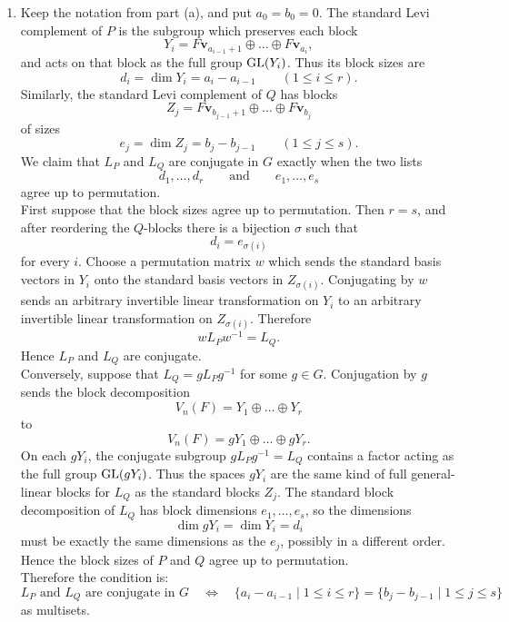\documentclass[../Odyssey_Project.tex]{subfiles}
\begin{document}
\begin{solution}
\begin{enumerate}
        \item[(b)] Keep the notation from part (a), and put $a_0=b_0=0$. The standard Levi complement of $P$ is the subgroup which preserves each block
    \[
        Y_i=F\mathbf{v}_{a_{i-1}+1}\oplus \dots \oplus F\mathbf{v}_{a_i},
    \]
    and acts on that block as the full group $\operatorname{GL}(Y_i)$. Thus its block sizes are
    \[
        d_i=\dim Y_i=a_i-a_{i-1}
        \qquad (1\leq i\leq r).
    \]
    Similarly, the standard Levi complement of $Q$ has blocks
    \[
        Z_j=F\mathbf{v}_{b_{j-1}+1}\oplus \dots \oplus F\mathbf{v}_{b_j}
    \]
    of sizes
    \[
        e_j=\dim Z_j=b_j-b_{j-1}
        \qquad (1\leq j\leq s).
    \]
    We claim that $L_P$ and $L_Q$ are conjugate in $G$ exactly when the two lists
    \[
        d_1,\dots,d_r
        \qquad\text{and}\qquad
        e_1,\dots,e_s
    \]
    agree up to permutation.\\
    First suppose that the block sizes agree up to permutation. Then $r=s$, and after reordering the $Q$-blocks there is a bijection $\sigma$ such that
    \[
        d_i=e_{\sigma(i)}
    \]
    for every $i$. Choose a permutation matrix $w$ which sends the standard basis vectors in $Y_i$ onto the standard basis vectors in $Z_{\sigma(i)}$. Conjugating by $w$ sends an arbitrary invertible linear transformation on $Y_i$ to an arbitrary invertible linear transformation on $Z_{\sigma(i)}$. Therefore
    \[
        wL_Pw^{-1}=L_Q.
    \]
    Hence $L_P$ and $L_Q$ are conjugate.\\
    Conversely, suppose that $L_Q=gL_Pg^{-1}$ for some $g\in G$. Conjugation by $g$ sends the block decomposition
    \[
        V_n(F)=Y_1\oplus \dots \oplus Y_r
    \]
    to
    \[
        V_n(F)=gY_1\oplus \dots \oplus gY_r.
    \]
    On each $gY_i$, the conjugate subgroup $gL_Pg^{-1}=L_Q$ contains a factor acting as the full group $\operatorname{GL}(gY_i)$. Thus the spaces $gY_i$ are the same kind of full general-linear blocks for $L_Q$ as the standard blocks $Z_j$. The standard block decomposition of $L_Q$ has block dimensions $e_1,\dots,e_s$, so the dimensions
    \[
        \dim gY_i=\dim Y_i=d_i
    \]
    must be exactly the same dimensions as the $e_j$, possibly in a different order. Hence the block sizes of $P$ and $Q$ agree up to permutation.\\
    Therefore the condition is:
    \[
        L_P\text{ and }L_Q\text{ are conjugate in }G
        \quad\Longleftrightarrow\quad
        \{a_i-a_{i-1}\mid 1\leq i\leq r\}
        =
        \{b_j-b_{j-1}\mid 1\leq j\leq s\}
    \]
    as multisets.
    \end{enumerate}
\end{solution}
\end{document}
